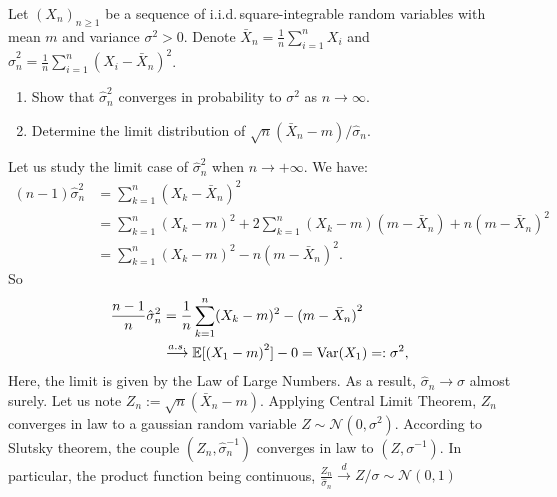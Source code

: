 
\begin{Exercise}
  Let ${\left(X_{n}\right)}_{n \geq 1}$ be a sequence of i.i.d.\,square-integrable random variables with mean $m$ and variance $\sigma^{2}>0$. Denote $\bar{X}_{n}=\frac{1}{n} \sum_{i=1}^{n} X_{i}$ and $\hat{\sigma}_{n}^{2}=\frac{1}{n} \sum_{i=1}^{n}{\left(X_{i}-\bar{X}_{n}\right)}^{2}$.

  \begin{enumerate}
    \item Show that $\hat{\sigma}_{n}^{2}$ converges in probability to $\sigma^{2}$ as $n
            \rightarrow \infty$.

    \item Determine the limit distribution of $\sqrt{n}\left(\bar{X}_{n}-m\right) /
            \hat{\sigma}_{n}$.

  \end{enumerate}
\end{Exercise}


\begin{solution}
  Let us study the limit case of $\hat{\sigma}_n^2$ when $n\to +\infty$. We have:
  \begin{align*}
    (n-1)\hat{\sigma}_n^2
     & =\sum_{k=1}^n{(X_k-\bar X_n)}^2                                                  \\
     & = \sum_{k=1}^n{(X_k-m)}^2 + 2\sum_{k=1}^n(X_k-m)(m-\bar X_n) + n{(m-\bar X_n)}^2 \\
     & = \sum_{k=1}^n{(X_k-m)}^2 - n{(m-\bar X_n)}^2.
  \end{align*}
  So
  \begin{align*}
    \frac{n-1}{n}\hat{\sigma}_n^2 & = \frac{1}{n}\sum_{k=1}^n(X_k-m)^2 - {(m-\bar X_n)}^2                            \\
                                  & \overset{a.s.}{\longrightarrow}\mathbb{E}[{(X_1-m)}^2] - 0 = \mathrm{Var}(X_1)=:
    \sigma^2,
  \end{align*}
  Here, the limit is given by the Law of Large Numbers. As a result, $\hat{\sigma}_n \to \sigma$ almost surely. Let us note $Z_n := \sqrt{n}(\bar X_n-m)$. Applying Central Limit Theorem, $Z_n$ converges in law to a gaussian random variable $Z\sim \mathcal{N}(0,\sigma^2)$. According to Slutsky theorem, the couple $(Z_n,\hat{\sigma}_n^{-1})$ converges in law to $(Z,\sigma^{-1})$. In particular, the product function being continuous, $\frac{Z_n}{\hat{\sigma}_n} \overset{d}{\rightarrow} Z/\sigma \sim \mathcal{N}(0,1)$
\end{solution}

